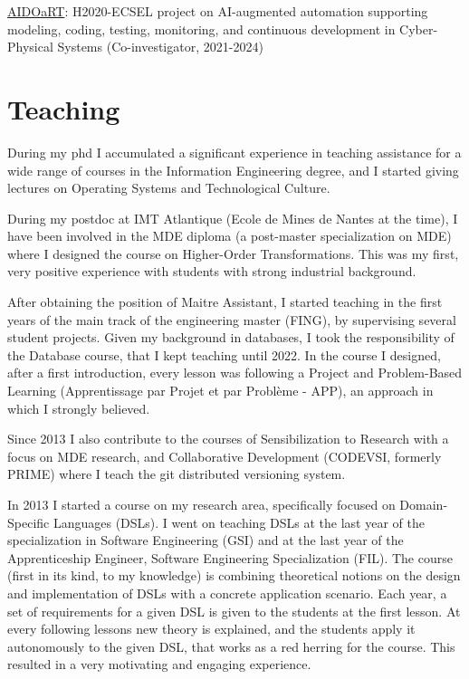 \documentclass[10pt,a4paper]{article}
\begin{document}
\medskip

  {\footnotesize \href{https://www.aidoart.eu/}{AIDOaRT}: H2020-ECSEL project on
  AI-augmented automation supporting modeling, coding, testing,
  monitoring, and continuous development in Cyber-Physical Systems
  (Co-investigator, 2021-2024)}

\section{Teaching}

During my phd I accumulated a significant experience in teaching assistance for a wide range of courses in the Information Engineering degree, and I started giving lectures on Operating Systems and Technological Culture. 

During my postdoc at IMT Atlantique (Ecole de Mines de Nantes at the time), I have been involved in the MDE diploma (a post-master specialization on MDE) where I designed the course on Higher-Order Transformations. This was my first, very positive experience with students with strong industrial background.

After obtaining the position of Maitre Assistant, I started teaching in the first years of the main track of the engineering master (FING), by supervising several student projects. Given my background in databases, I took the responsibility of the Database course, that I kept teaching until 2022. In the course I designed, after a first introduction, every lesson was following a Project and Problem-Based Learning (Apprentissage par Projet et par Problème - APP), an approach in which I strongly believed.

Since 2013 I also contribute to the courses of Sensibilization to Research with a focus on MDE research, and Collaborative Development (CODEVSI, formerly PRIME) where I teach the git distributed versioning system. 

In 2013 I started a course on my research area, specifically focused on Domain-Specific Languages (DSLs). I went on teaching DSLs at the last year of the specialization in Software Engineering (GSI) and at the last year of the Apprenticeship Engineer, Software Engineering Specialization (FIL). The course (first in its kind, to my knowledge) is combining theoretical notions on the design and implementation of DSLs with a concrete application scenario. Each year, a set of requirements for a given DSL is given to the students at the first lesson. At every following lessons new theory is explained, and the students apply it autonomously to the given DSL, that works as a red herring for the course. This resulted in a very motivating and engaging experience. 
\end{document}

